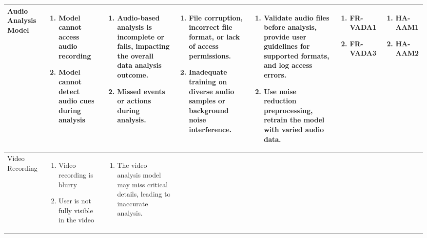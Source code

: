 \documentclass{article}
\begin{document}
\begin{landscape}
\begin{longtable}{|p{3cm}|p{3cm}|p{4cm}|p{4cm}|p{3cm}|p{2cm}|p{3cm}|}
  \hline
  Audio Analysis Model & 
  \begin{enumerate}[leftmargin=*]
      \item Model cannot access audio recording
      \item Model cannot detect audio cues during analysis
  \end{enumerate} & 
  \begin{enumerate}[leftmargin=*]
      \item Audio-based analysis is incomplete or fails, impacting the overall data analysis outcome.
      \item Missed events or actions during analysis.
  \end{enumerate} &
  \begin{enumerate}[leftmargin=*]
       \item File corruption, incorrect file format, or lack of access permissions.
       \item Inadequate training on diverse audio samples or background noise interference.
  \end{enumerate} &
  \begin{enumerate}[leftmargin=*]
       \item Validate audio files before analysis, provide user guidelines for supported formats, and log access errors.
       \item Use noise reduction preprocessing, retrain the model with varied audio data.
  \end{enumerate} &
  \begin{enumerate}[leftmargin=*]
       \item FR-VADA1
       \item FR-VADA3
  \end{enumerate} &
  \begin{enumerate}[leftmargin=*]
       \item HA-AAM1
       \item HA-AAM2
  \end{enumerate} \\
  \hline
  Video Recording & 
  \begin{enumerate}[leftmargin=*]
      \item Video recording is blurry
      \item User is not fully visible in the video
  \end{enumerate} & 
  \begin{enumerate}[leftmargin=*]
      \item The video analysis model may miss critical details, leading to inaccurate analysis.

\end{enumerate}
\end{longtable}
\end{landscape}
\end{document}
